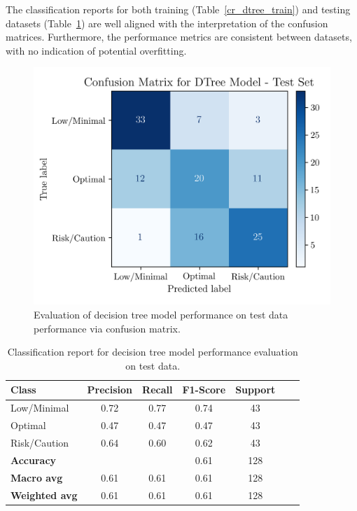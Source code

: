 \documentclass[conference]{IEEEtran}
\begin{document}
The classification reports for both training (Table~\ref{cr_dtree_train}) and testing datasets (Table~\ref{cr_dtree_test}) are well aligned with the interpretation of the confusion matrices. Furthermore, the performance metrics are consistent between datasets, with no indication of potential overfitting.

\begin{figure}[H]
    \centering
    \includegraphics[width=1\linewidth]{assets/DTREE_ConfusionMatrixTest.png}
    \caption{Evaluation of decision tree model performance on test data performance via confusion matrix.}
    \label{dtree_cmtest}
\end{figure} %

\begin{table}[H]
\centering
\caption{Classification report for decision tree model performance evaluation on test data.}
\label{cr_dtree_test}
\begin{tabular}{lcccccc}
\toprule
\textbf{Class} & \textbf{Precision} & \textbf{Recall} & \textbf{F1-Score} & \textbf{Support} \\
\midrule
Low/Minimal & 0.72 & 0.77 & 0.74 & 43 \\
Optimal & 0.47 & 0.47 & 0.47 & 43 \\
Risk/Caution & 0.64 & 0.60 & 0.62 & 43 \\
\midrule
\textbf{Accuracy} &  &  & 0.61 & 128 \\
\textbf{Macro avg} & 0.61 & 0.61 & 0.61 & 128 \\
\textbf{Weighted avg} & 0.61 & 0.61 & 0.61 & 128 \\
\bottomrule
\end{tabular}
\end{table} %
\end{document}
